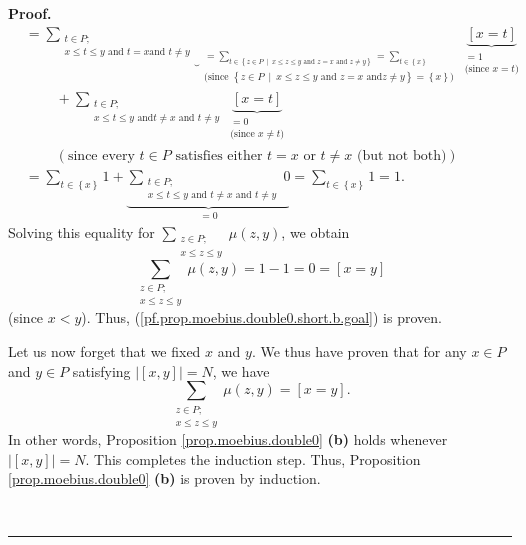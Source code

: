 \documentclass[numbers=enddot,12pt,final,onecolumn,notitlepage]{scrartcl}%
\theoremstyle{definition}
\newenvironment{proof}[1][Proof]{\noindent\textbf{#1.} }{\ \rule{0.5em}{0.5em}}
\newenvironment{vershort}{}{}
\let\sumnonlimits\sum
\renewcommand{\sum}{\sumnonlimits\limits}
\begin{document}
\begin{vershort}
\begin{proof}
\begin{align*}
&  =\underbrace{\sum_{\substack{t\in P;\\x\leq t\leq y\text{ and }t=x\text{
and }t\neq y}}}_{\substack{=\sum_{t\in\left\{  z\in P\ \mid\ x\leq z\leq
y\text{ and }z=x\text{ and }z\neq y\right\}  }=\sum_{t\in\left\{  x\right\}
}\\\text{(since }\left\{  z\in P\ \mid\ x\leq z\leq y\text{ and }z=x\text{ and
}z\neq y\right\}  =\left\{  x\right\}  \text{)}}}\underbrace{\left[
x=t\right]  }_{\substack{=1\\\text{(since }x=t\text{)}}}\\
&  \ \ \ \ \ \ \ \ \ \ +\sum_{\substack{t\in P;\\x\leq t\leq y\text{ and
}t\neq x\text{ and }t\neq y}}\underbrace{\left[  x=t\right]  }%
_{\substack{=0\\\text{(since }x\neq t\text{)}}}\\
&  \ \ \ \ \ \ \ \ \ \ \left(  \text{since every }t\in P\text{ satisfies
either }t=x\text{ or }t\neq x\text{ (but not both)}\right) \\
&  =\sum_{t\in\left\{  x\right\}  }1+\underbrace{\sum_{\substack{t\in
P;\\x\leq t\leq y\text{ and }t\neq x\text{ and }t\neq y}}0}_{=0}=\sum
_{t\in\left\{  x\right\}  }1=1.
\end{align*}
Solving this equality for $\sum_{\substack{z\in P;\\x\leq z\leq y}}\mu\left(
z,y\right)  $, we obtain%
\[
\sum_{\substack{z\in P;\\x\leq z\leq y}}\mu\left(  z,y\right)  =1-1=0=\left[
x=y\right]
\]
(since $x<y$). Thus, (\ref{pf.prop.moebius.double0.short.b.goal}) is proven.

Let us now forget that we fixed $x$ and $y$. We thus have proven that for any
$x\in P$ and $y\in P$ satisfying $\left\vert \left[  x,y\right]  \right\vert
=N$, we have%
\[
\sum_{\substack{z\in P;\\x\leq z\leq y}}\mu\left(  z,y\right)  =\left[
x=y\right]  .
\]
In other words, Proposition \ref{prop.moebius.double0} \textbf{(b)} holds
whenever $\left\vert \left[  x,y\right]  \right\vert =N$. This completes the
induction step. Thus, Proposition \ref{prop.moebius.double0} \textbf{(b)} is
proven by induction.


\end{proof}
\end{vershort}
\end{document}

